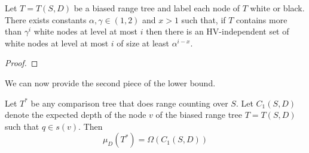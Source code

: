 \documentclass[lotsofwhite,charterfonts]{patmorin}
\begin{document}
\begin{lem}
Let $T=T(S,D)$ be a biased range tree and label each node of $T$ white
or black.  There exists constants $\alpha,\gamma\in(1,2)$ and $x>1$ such that,
if $T$ contains more than $\gamma^i$ white nodes at level at most $i$
then there is an HV-independent set of white nodes at level at most $i$
of size at least $\alpha^{i-x}$.
\end{lem}

\begin{proof}
\end{proof}

We can now provide the second piece of the lower bound.

\begin{lem}
Let $T^*$ be any comparison tree that does range counting over $S$. Let
$C_1(S,D)$ denote the expected depth of the node $v$ of the biased
range tree $T=T(S,D)$ such that $q\in s(v)$.  Then
\[
    \mu_D(T^*) = \Omega(C_1(S,D))
\]
\end{lem}
\end{document}
